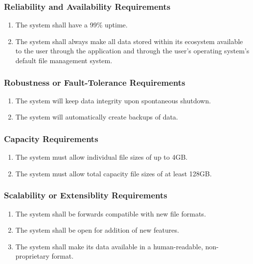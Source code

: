 \documentclass{article}
\begin{document}
\subsubsection{Reliability and Availability Requirements}
\begin{enumerate}[R{A}R1]
    \item The system shall have a 99\% uptime.
    \item The system shall always make all data stored within its ecosystem available to the user through the application and through the user's operating system's default file management system.
\end{enumerate}

\subsubsection{Robustness or Fault-Tolerance Requirements}
\begin{enumerate}[RFR1]
    \item The system will keep data integrity upon spontaneous shutdown.
    \item The system will automatically create backups of data.
\end{enumerate}

\subsubsection{Capacity Requirements}
\begin{enumerate}[CR1]
    \item The system must allow individual file sizes of up to 4GB.
    \item The system must allow total capacity file sizes of at least 128GB.
\end{enumerate}

\subsubsection{Scalability or Extensiblity Requirements}
\begin{enumerate}[SER1]
    \item The system shall be forwards compatible with new file formats.
    \item The system shall be open for addition of new features.
    \item The system shall make its data available in a human-readable, non-proprietary format.
\end{enumerate}
\end{document}
